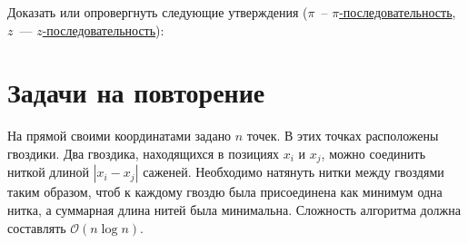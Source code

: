 \documentclass[addpoints]{exam}
\begin{document}
\begin{questions}
\question[1] Доказать или опровергнуть следующие утверждения ($\pi$~-- \hyperref[piseq]{$\pi$-последовательность}, $z$~--- \hyperref[zseq]{$z$-последовательность}):

\section{Задачи на повторение}

\question[\half] На прямой своими координатами задано $n$ точек. В этих точках расположены гвоздики. Два гвоздика, находящихся в позициях $x_i$ и $x_j$, можно соединить ниткой длиной $|x_i - x_j|$ саженей. Необходимо натянуть нитки между гвоздями таким образом, чтоб к каждому гвоздю была присоединена как минимум одна нитка, а суммарная длина нитей была минимальна. Сложность алгоритма должна составлять $\mathcal{O}( n \log n)$.

\begin{solution}


\end{solution}
\end{questions}
\end{document}
